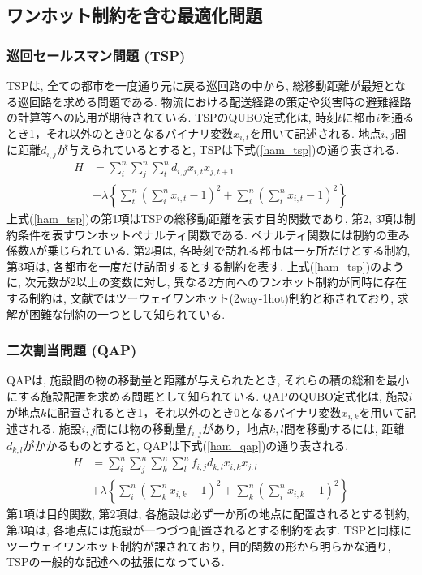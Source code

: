 \documentclass[submit,techrep,noauthor]{ipsj}
\begin{document}
\subsection{ワンホット制約を含む最適化問題}

\subsubsection{巡回セールスマン問題 (TSP)}
TSPは, 全ての都市を一度通り元に戻る巡回路の中から, 総移動距離が最短となる巡回路を求める問題である. 物流における配送経路の策定や災害時の避難経路の計算等への応用が期待されている. TSPのQUBO定式化は, 時刻$t$に都市$i$を通るとき1，それ以外のとき0となるバイナリ変数$x_{i,t}$を用いて記述される. 
地点$i, j$間に距離$d_{i, j}$が与えられているとすると, TSPは下式(\ref{ham_tsp})の通り表される.
\begin{align}
H &= \sum_{i}^{n}\sum_{j}^{n}\sum_{t}^{n}d_{i,j}x_{i,t}x_{j,t+1}\nonumber\\
&+\lambda\left\{\sum_{t}^{n}\left(\sum_{i}^{n}x_{i,t}-1\right)^{2} + \sum_{i}^{n}\left(\sum_{t}^{n}x_{i,t}-1\right)^{2}\right\} \label{ham_tsp}
\end{align}
上式(\ref{ham_tsp})の第1項はTSPの総移動距離を表す目的関数であり, 第2, 3項は制約条件を表すワンホットペナルティ関数である. ペナルティ関数には制約の重み係数$\lambda$が乗じられている. 第2項は, 各時刻で訪れる都市は一ヶ所だけとする制約, 第3項は, 各都市を一度だけ訪問するとする制約を表す. 上式(\ref{ham_tsp})のように, 次元数が2以上の変数に対し, 異なる2方向へのワンホット制約が同時に存在する制約は, 文献\cite{yatabe}ではツーウェイワンホット(2way-1hot)制約と称されており, 求解が困難な制約の一つとして知られている.

\subsubsection{二次割当問題 (QAP)}
QAPは, 施設間の物の移動量と距離が与えられたとき, それらの積の総和を最小にする施設配置を求める問題として知られている. QAPのQUBO定式化は, 施設$i$が地点$k$に配置されるとき1，それ以外のとき0となるバイナリ変数$x_{i,k}$を用いて記述される. 施設$i, j$間には物の移動量$f_{i,j}$があり，地点$k, l$間を移動するには, 距離$d_{k, l}$がかかるものとすると,
 QAPは下式(\ref{ham_qap})の通り表される.
\begin{align}
H &= \sum_{i}^{n}\sum_{j}^{n}\sum_{k}^{n}\sum_{l}^{n}f_{i,j}d_{k,l}x_{i,k}x_{j,l}\nonumber\\
&+\lambda\left\{\sum_{i}^{n}\left(\sum_{k}^{n}x_{i,k}-1\right)^{2} + \sum_{k}^{n}\left(\sum_{i}^{n}x_{i,k}-1\right)^{2}\right\} \label{ham_qap}
\end{align}
第1項は目的関数, 第2項は, 各施設は必ず一か所の地点に配置されるとする制約, 第3項は, 各地点には施設が一つづつ配置されるとする制約を表す. TSPと同様にツーウェイワンホット制約が課されており, 目的関数の形から明らかな通り, TSPの一般的な記述への拡張になっている.
\end{document}
